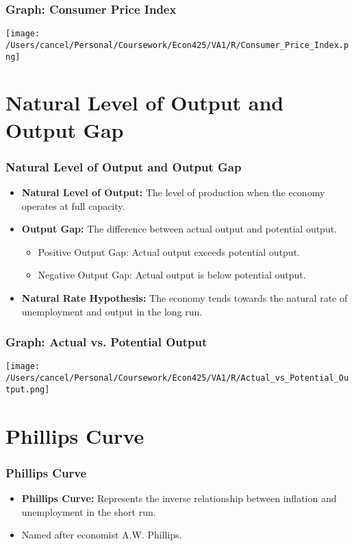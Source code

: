 \documentclass{beamer}
\begin{document}
\begin{frame}
    \frametitle{Graph: Consumer Price Index}
    \begin{center}
        \texttt{[image: /Users/cancel/Personal/Coursework/Econ425/VA1/R/Consumer\_Price\_Index.png]}
    \end{center}
\end{frame}

\section{Natural Level of Output and Output Gap}
\begin{frame}
    \frametitle{Natural Level of Output and Output Gap}
    \begin{itemize}
        \item \textbf{Natural Level of Output:} The level of production when the economy operates at full capacity.
        \item \textbf{Output Gap:} The difference between actual output and potential output.
        \begin{itemize}
            \item Positive Output Gap: Actual output exceeds potential output.
            \item Negative Output Gap: Actual output is below potential output.
        \end{itemize}
        \item \textbf{Natural Rate Hypothesis:} The economy tends towards the natural rate of unemployment and output in the long run.
    \end{itemize}
\end{frame}

\begin{frame}
    \frametitle{Graph: Actual vs. Potential Output}
    \begin{center}
        \texttt{[image: /Users/cancel/Personal/Coursework/Econ425/VA1/R/Actual\_vs\_Potential\_Output.png]}
    \end{center}
\end{frame}

\section{Phillips Curve}
\begin{frame}
    \frametitle{Phillips Curve}
    \begin{itemize}
        \item \textbf{Phillips Curve:} Represents the inverse relationship between inflation and unemployment in the short run.
        \item Named after economist A.W. Phillips.
    \end{itemize}
\end{frame}
\end{document}
